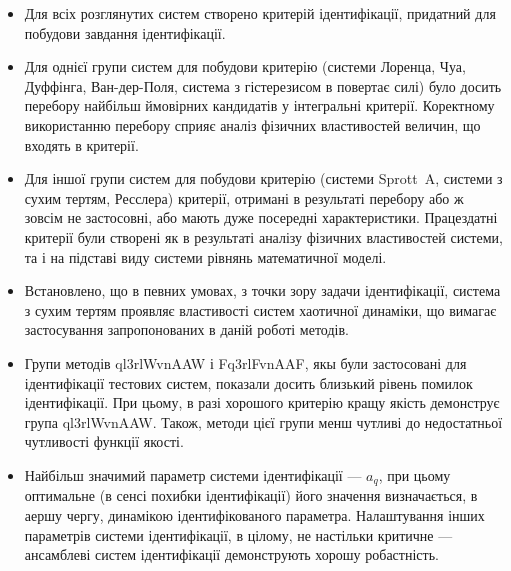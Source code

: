 \begin{itemize}

  \item
    Для всіх розглянутих систем створено критерій
    ідентифікації, придатний для побудови завдання ідентифікації.

  \item
    Для однієї групи систем для побудови критерію (системи Лоренца,
    Чуа, Дуффінга, Ван-дер-Поля, система з гістерезисом в повертає
    силі) було досить перебору найбільш ймовірних кандидатів у
    інтегральні критерії. Коректному використанню перебору сприяє
    аналіз фізичних властивостей величин, що входять в критерії.

  \item
    Для іншої групи систем для побудови критерію (системи Sprott~A,
    системи з сухим тертям, Ресслера) критерії, отримані в результаті
    перебору або ж зовсім не застосовні, або мають дуже посередні
    характеристики. Працездатні критерії були створені як в
    результаті аналізу фізичних властивостей системи, та і на
    підставі виду системи рівнянь математичної моделі.


  \item
    Встановлено, що в певних умовах, з точки зору задачи
    ідентифікації, система з сухим тертям проявляє властивості
    систем хаотичної динаміки, що вимагає застосування
    запропонованих в даній роботі методів.


  \item
    Групи методів ql3rlWvnAAW і Fq3rlFvnAAF, якы були застосовані для ідентифікації
    тестових систем, показали досить близький рівень помилок
    ідентифікації. При цьому, в разі хорошого критерію кращу якість
    демонструє група ql3rlWvnAAW. Також, методи цієї групи менш чутливі
    до недостатньої чутливості функції якості.

  \item
    Найбільш значимий параметр системи ідентифікації ---
    $a_q $, при цьому оптимальне (в сенсі похибки ідентифікації)
    його значення визначається, в аершу чергу, динамікою
    ідентифікованого параметра. Налаштування інших параметрів
    системи ідентифікації, в цілому, не настільки критичне ---
    ансамблеві систем ідентифікації демонструють хорошу робастність.


\end{itemize}







